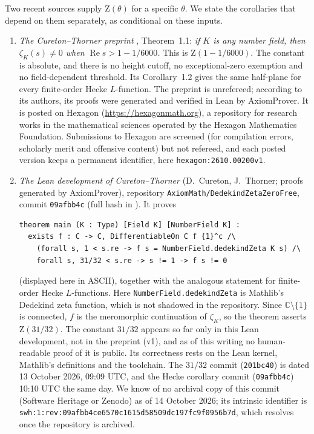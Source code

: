 \documentclass[11pt]{amsart}
\theoremstyle{definition}
\theoremstyle{remark}
\newcommand{\C}{\mathbb{C}}
\newcommand{\Zt}{\mathrm{Z}}       %
\begin{document}
Two recent sources supply $\Zt(\theta)$ for a specific $\theta$. We state the corollaries that depend on them
separately, as conditional on these inputs.
\begin{enumerate}[label=(I\arabic*),leftmargin=*]
\item \emph{The Cureton--Thorner preprint} \cite{CT}, Theorem~1.1: \emph{if $K$ is any number field, then
  $\zeta_K(s)\neq0$ when $\operatorname{Re}s>1-1/6000$.} This is $\Zt(1-1/6000)$. The constant is absolute, and there is
  no height cutoff, no exceptional-zero exemption and no field-dependent threshold. Its Corollary~1.2 gives the same
  half-plane for every finite-order Hecke $L$-function. The preprint is unrefereed; according to its authors, its
  proofs were generated and verified in Lean by AxiomProver. It is posted on Hexagon (\url{https://hexagonmath.org}),
  a repository for research works in the mathematical sciences operated by the Hexagon Mathematics Foundation.
  Submissions to Hexagon are screened (for compilation errors, scholarly merit and offensive content) but not
  refereed, and each posted version keeps a permanent identifier, here \texttt{hexagon:2610.00200v1}.
\item \emph{The Lean development of Cureton--Thorner} \cite{CT-Lean} (D.~Cureton, J.~Thorner; proofs generated by
  AxiomProver), repository \texttt{AxiomMath/DedekindZetaZeroFree}, commit \texttt{09afbb4c} (full hash in
  \cite{CT-Lean}). It proves
\begin{verbatim}
theorem main (K : Type) [Field K] [NumberField K] :
  exists f : C -> C, DifferentiableOn C f {1}^c /\
    (forall s, 1 < s.re -> f s = NumberField.dedekindZeta K s) /\
    forall s, 31/32 < s.re -> s != 1 -> f s != 0
\end{verbatim}
  (displayed here in ASCII), together with the analogous statement for finite-order Hecke $L$-functions. Here
  \texttt{NumberField.dedekindZeta} is Mathlib's Dedekind zeta function, which is not shadowed in the repository.
  Since $\C\setminus\{1\}$ is connected, $f$ is the meromorphic continuation of $\zeta_K$, so the theorem asserts
  $\Zt(31/32)$. The constant $31/32$ appears so far only in this Lean development, not in the preprint \cite{CT}
  (v1), and as of this writing no human-readable proof of it is public. Its correctness rests on the Lean kernel,
  Mathlib's definitions and the toolchain. The $31/32$ commit (\texttt{201bc40}) is dated 13 October 2026, 09:09 UTC,
  and the Hecke corollary commit (\texttt{09afbb4c}) 10:10 UTC the same day. We know of no archival copy of this
  commit (Software Heritage or Zenodo) as of 14 October 2026; its intrinsic identifier is
  \texttt{swh:1:rev:09afbb4ce6570c1615d58509dc197fc9f0956b7d}, which resolves once the repository is archived.


\end{enumerate}
\end{document}
